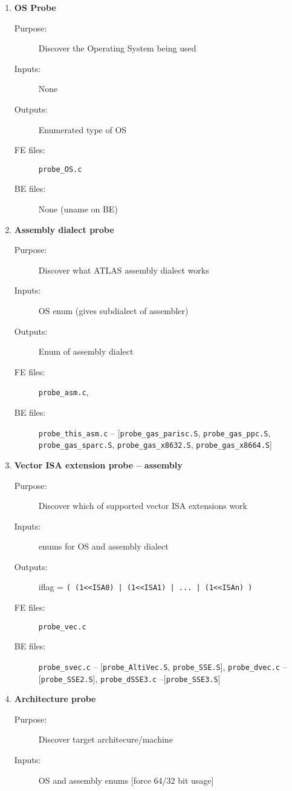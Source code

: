 \documentclass[11pt]{article}
\begin{document}
\begin{enumerate}
\item {\bf OS Probe}
   \begin{description}
   \item [Purpose:] Discover the Operating System being used
   \item [Inputs:]  None
   \item [Outputs:] Enumerated type of OS
   \item [FE files:] {\tt probe\_OS.c}
   \item [BE files:] None (uname on BE)
   \end{description}
\item {\bf Assembly dialect probe}
   \begin{description}
   \item [Purpose:] Discover what ATLAS assembly dialect works
   \item [Inputs:]  OS enum (gives subdialect of assembler)
   \item [Outputs:] Enum of assembly dialect
   \item [FE files:] {\tt probe\_asm.c}, 
   \item [BE files:] {\tt probe\_this\_asm.c} -- [{\tt probe\_gas\_parisc.S}, 
         {\tt probe\_gas\_ppc.S}, {\tt probe\_gas\_sparc.S}, 
         {\tt probe\_gas\_x8632.S}, {\tt probe\_gas\_x8664.S}]
   \end{description}
\item {\bf Vector ISA extension probe -- assembly}
   \begin{description}
   \item [Purpose:] Discover which of supported vector ISA extensions work
   \item [Inputs:]  enums for OS and assembly dialect
   \item [Outputs:] iflag = \verb+( (1<<ISA0) | (1<<ISA1) | ... | (1<<ISAn) )+
   \item [FE files:] {\tt probe\_vec.c} 
   \item [BE files:] {\tt probe\_svec.c} --
                  [{\tt probe\_AltiVec.S}, {\tt probe\_SSE.S}],
                  {\tt probe\_dvec.c} -- [{\tt probe\_SSE2.S}],
                  {\tt probe\_dSSE3.c} --[{\tt probe\_SSE3.S}]
   \end{description}
\item {\bf Architecture probe}
   \begin{description}
   \item [Purpose:] Discover target architecure/machine
   \item [Inputs:]  OS and assembly enums [force 64/32 bit usage]

\end{description}
\end{enumerate}
\end{document}
